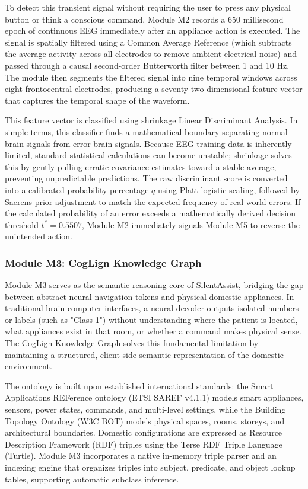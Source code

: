 \documentclass[12pt,a4paper]{report}
\begin{document}
To detect this transient signal without requiring the user to press any physical button or think a conscious command, Module M2 records a 650 millisecond epoch of continuous EEG immediately after an appliance action is executed. The signal is spatially filtered using a Common Average Reference (which subtracts the average activity across all electrodes to remove ambient electrical noise) and passed through a causal second-order Butterworth filter between 1 and 10 Hz. The module then segments the filtered signal into nine temporal windows across eight frontocentral electrodes, producing a seventy-two dimensional feature vector that captures the temporal shape of the waveform.

This feature vector is classified using shrinkage Linear Discriminant Analysis. In simple terms, this classifier finds a mathematical boundary separating normal brain signals from error brain signals. Because EEG training data is inherently limited, standard statistical calculations can become unstable; shrinkage solves this by gently pulling erratic covariance estimates toward a stable average, preventing unpredictable predictions. The raw discriminant score is converted into a calibrated probability percentage $q$ using Platt logistic scaling, followed by Saerens prior adjustment to match the expected frequency of real-world errors. If the calculated probability of an error exceeds a mathematically derived decision threshold $t^* = 0.5507$, Module M2 immediately signals Module M5 to reverse the unintended action.

\subsubsection{Module M3: CogLign Knowledge Graph}
Module M3 serves as the semantic reasoning core of SilentAssist, bridging the gap between abstract neural navigation tokens and physical domestic appliances. In traditional brain-computer interfaces, a neural decoder outputs isolated numbers or labels (such as "Class 1") without understanding where the patient is located, what appliances exist in that room, or whether a command makes physical sense. The CogLign Knowledge Graph solves this fundamental limitation by maintaining a structured, client-side semantic representation of the domestic environment.

The ontology is built upon established international standards: the Smart Applications REFerence ontology (ETSI SAREF v4.1.1) models smart appliances, sensors, power states, commands, and multi-level settings, while the Building Topology Ontology (W3C BOT) models physical spaces, rooms, storeys, and architectural boundaries. Domestic configurations are expressed as Resource Description Framework (RDF) triples using the Terse RDF Triple Language (Turtle). Module M3 incorporates a native in-memory triple parser and an indexing engine that organizes triples into subject, predicate, and object lookup tables, supporting automatic subclass inference.
\end{document}
